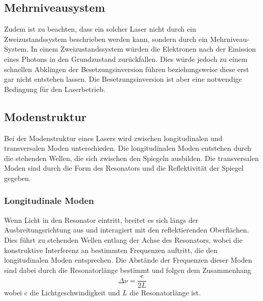 \subsection{Mehrniveausystem}\label{sec:mehrniveausystem}
Zudem ist zu beachten, dass ein solcher Laser nicht durch ein Zweizustandssystem beschrieben werden kann, sondern durch ein Mehrniveau-System. In einem Zweizustandssystem würden die Elektronen
nach der Emission eines Photons in den Grundzustand zurückfallen. Dies würde jedoch zu einem schnellen Abklingen der Besetzungsinversion führen beziehungsweise diese erst gar nicht entstehen lassen. 
Die Besetzungsinversion ist aber eine notwendige Bedingung für den Laserbetrieb.\\
\subsection{Modenstruktur}\label{sec:modenstruktur}
Bei der Modenstruktur eines Lasers wird zwischen longitudinalen und transversalen Moden unterschieden. Die longitudinalen Moden entstehen durch die stehenden Wellen, die sich zwischen den Spiegeln
ausbilden. Die transversalen Moden sind durch die Form des Resonators und die Reflektivität der Spiegel gegeben.\\
\subsubsection{Longitudinale Moden}\label{sec:longitudinalemoden}
Wenn Licht in den Resonator eintritt, breitet es sich längs der Ausbreitungsrichtung aus und interagiert mit den reflektierenden Oberflächen.
Dies führt zu stehenden Wellen entlang der Achse des Resonators, wobei die konstruktive Interferenz an bestimmten Frequenzen auftritt, die den longitudinalen Moden entsprechen.
Die Abstände der Frequenzen dieser Moden sind dabei durch die Resonatorlänge bestimmt und folgen dem Zusammenhang
\begin{equation}
    \label{eqn:long}
    \Delta \nu = \frac{\text{c}}{2 L}
\end{equation}
wobei c die Lichtgeschwindigkeit und $L$ die Resonatorlänge ist.
